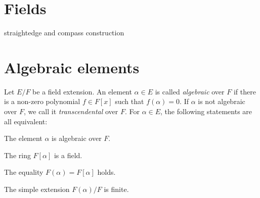\documentclass{../../large}
\begin{document}
\section{Fields}
\begin{prb}
\end{prb}
\begin{prb}
\end{prb}
\begin{prb}
\end{prb}
\begin{prb}
\end{prb}
straightedge and compass construction



\section{Algebraic elements}
\begin{prb}
Let $E/F$ be a field extension.
An element $\alpha\in E$ is called \emph{algebraic} over $F$ if there is a non-zero polynomial $f\in F[x]$ such that $f(\alpha)=0$.
If $\alpha$ is not algebraic over $F$, we call it \emph{transcendental} over $F$.
For $\alpha\in E$, the following statements are all equivalent:
\begin{parts}
\item The element $\alpha$ is algebraic over $F$.
\item The ring $F[\alpha]$ is a field.
\item The equality $F(\alpha)=F[\alpha]$ holds.
\item The simple extension $F(\alpha)/F$ is finite.
\end{parts}
\end{prb}
\end{document}

